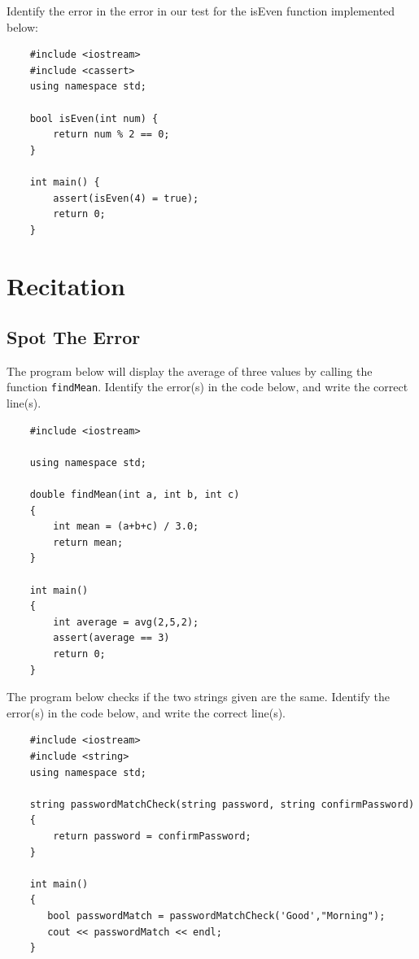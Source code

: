\begin{problem}
Identify the error in the error in our test for the isEven function implemented below:
    \begin{verbatim}
    #include <iostream>
    #include <cassert>
    using namespace std;
    
    bool isEven(int num) {
        return num % 2 == 0;
    }
    
    int main() {
        assert(isEven(4) = true);
        return 0;
    }
    \end{verbatim}
\end{problem}

\section{Recitation}

\subsection{Spot The Error}
\begin{multipart}
The program below will display the average of three values by calling the function \texttt{findMean}. Identify the error(s) in the code below, and write the correct line(s).
\end{multipart}

\begin{verbatim}
    #include <iostream>
    
    using namespace std;
    
    double findMean(int a, int b, int c)
    {
        int mean = (a+b+c) / 3.0;
        return mean;
    }
    
    int main()
    {
        int average = avg(2,5,2);
        assert(average == 3)
        return 0;
    }
\end{verbatim}

\begin{multipart}
The program below checks if the two strings given are the same. Identify the error(s) in the code below, and write the correct line(s).
\end{multipart}

\begin{verbatim}
    #include <iostream>
    #include <string>
    using namespace std;
    
    string passwordMatchCheck(string password, string confirmPassword) 
    {
        return password = confirmPassword;
    }
    
    int main()
    {
       bool passwordMatch = passwordMatchCheck('Good',"Morning");
       cout << passwordMatch << endl;
    }
\end{verbatim}

